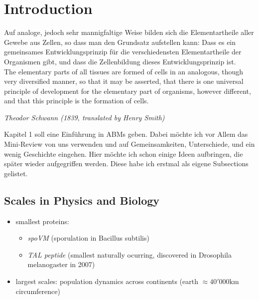 \chapter{Introduction}

\epigraph{
    Auf analoge, jedoch sehr mannigfaltige Weise bilden sich die Elementartheile
    aller Gewebe aus Zellen, so dass man den Grundsatz aufstellen kann: Dass es ein gemeinsames
    Entwicklungsprinzip für die verschiedensten Elementartheile der Organismen gibt, und dass die
    Zellenbildung dieses Entwicklungsprinzip ist.\\
    \vspace{0.25cm}
    The elementary parts of all tissues are formed of cells in an analogous, though very diversified
    manner, so that it may be asserted, that there is one universal principle of development for
    the elementary part of organisms, however different, and that this principle is the formation
    of cells.
}{\textit{Theodor Schwann (1839, translated by Henry Smith)}}

\cite{Schwann1847}

Kapitel 1 soll eine Einführung in ABMs geben. Dabei möchte ich vor Allem das Mini-Review
von uns verwenden und auf Gemeinsamkeiten, Unterschiede, und ein wenig Geschichte
eingehen. Hier möchte ich schon einige Ideen aufbringen, die später wieder aufgegriffen
werden. Diese habe ich erstmal als eigene Subsections gelistet.

\section{Scales in Physics and Biology}
\begin{itemize}
    \item smallest proteins:
        \begin{itemize}
            \item \textit{spoVM} \cite{Levin1993} (sporulation in Bacillus subtilis)
            \item \textit{TAL peptide} (smallest naturally ocurring, discovered in
                Drosophila melanogaster in 2007) \cite{Galindo2007}
        \end{itemize}
    \item largest scales: population dynamics across continents (earth $\approx
        40'000\text{km}$ circumference)
\end{itemize}

